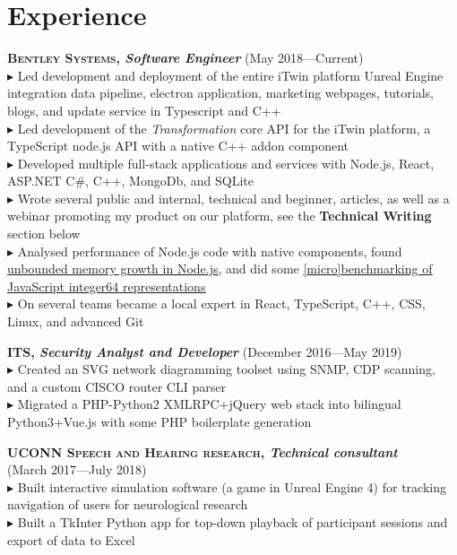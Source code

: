 \documentclass[Letterpaper,11pt]{article}
\newcommand\bul{$\blacktriangleright$ }
\newcommand\link[2]{\href{#1}{\underline{#2}}}
\begin{document}
\section*{Experience}

    \textbf{\textsc{Bentley Systems}, \textit{Software Engineer}} (May 2018---Current)\\
        \bul Led development and deployment of the entire iTwin platform Unreal Engine integration data pipeline, electron application, marketing webpages, tutorials, blogs, and update service
            in Typescript and C++
        \\
        \bul Led development of the \textit{Transformation} core API for the iTwin platform, a TypeScript node.js API with a native C++ addon component
        \\
        \bul Developed multiple full-stack applications and services with Node.js, React, ASP.NET C\#, C++, MongoDb, and SQLite
        \\
        \bul Wrote several public and internal, technical and beginner, articles, as well as a webinar promoting my product on our
        platform, see the \textbf{Technical Writing} section below
        \\
        \bul Analysed performance of Node.js code with native components, found \link{https://github.com/nodejs/node-addon-api/issues/1140}{unbounded memory growth in Node.js},
        and did some \link{https://github.com/MichaelBelousov/javascript-int64-benchmarks}{[micro]benchmarking of JavaScript integer64 representations}
        \\
        \bul On several teams became a local expert in React, TypeScript, C++, CSS, Linux, and advanced Git

    \textbf{\textsc{ITS}, \textit{Security Analyst and Developer}} (December 2016---May 2019)\\
        \bul Created an SVG network diagramming toolset using SNMP, CDP scanning,
        and a custom CISCO router CLI parser
        \\
        \bul Migrated a PHP-Python2 XMLRPC+jQuery web stack into bilingual Python3+Vue.js
        with some PHP boilerplate generation

    \textbf{\textsc{UCONN Speech and Hearing research}, \textit{Technical consultant}}\\
    (March 2017---July 2018)\\
        \bul Built interactive simulation software (a game in Unreal Engine 4)
        for tracking navigation of users for neurological research
        \\
        \bul Built a TkInter Python app for top-down playback of participant sessions and export of data to Excel
        
\end{document}

